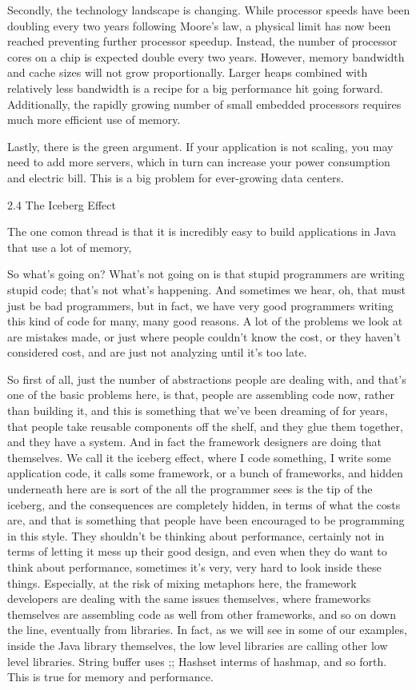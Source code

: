 \begin{itemize}
Secondly, the technology landscape is changing. While processor speeds have been doubling every two years following Moore's law, a physical limit has now been reached preventing further processor speedup. Instead, the number of processor cores on a chip is expected double every two years. However, memory bandwidth and cache sizes will not grow proportionally. Larger heaps combined with relatively less bandwidth is a recipe for a big performance hit going forward. Additionally, the rapidly growing number of small embedded processors requires much more efficient use of memory.

Lastly, there is the green argument. If your application is not scaling, you may need to add more servers, which in turn can increase your power consumption and electric bill. This is a big problem for ever-growing data centers.


2.4 The Iceberg Effect

The one comon thread is that it is incredibly easy to build applications in Java that use a lot of memory, 

So what's going on? What's not going on is that stupid programmers are writing stupid code; that's not what's happening.  And sometimes we hear, oh, that must just be bad programmers, but in fact, we have very good programmers writing this kind of code for many, many good reasons. A lot of the problems we look at are mistakes made, or just where people couldn't know the cost, or they haven't considered cost, and are just not analyzing until it's too late. 

So first of all, just the number of abstractions people are dealing with, and that's one of the basic problems here, is that, people are assembling code now, rather than building it, and this is something that we've been dreaming of for years, that people take reusable components off the shelf, and they glue them together, and they have a system.
And in fact the framework designers are doing that themselves.  We call it the iceberg effect, where I code something, I write some application code, it calls some framework, or a bunch of frameworks, and hidden underneath here are is sort of the all the programmer sees is the tip of the iceberg, and the consequences are completely hidden, in terms of what the costs are, and that is something that people have been encouraged to be programming in this style. They shouldn't be thinking about performance, certainly not in terms of letting it mess up their good design, and even when they do want to think about performance, sometimes it's very, very hard to look inside these things.  Especially, at the risk of mixing metaphors here, the framework developers are dealing with the same issues themselves, where frameworks themselves are assembling code as well from other frameworks, and so on down the line, eventually from libraries. In fact, as we will see in some of our examples, inside the Java library themselves, the low level libraries are calling other low level libraries.  String buffer uses ;;  Hashset interms of hashmap, and so forth.  This is true for memory and performance.


\end{itemize}
